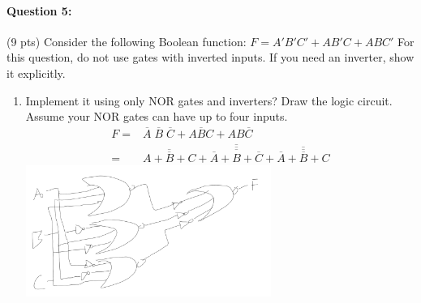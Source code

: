 \documentclass[12pt,letterpaper,titlepage]{report}
\begin{document}
\paragraph{Question 5: } (9 pts)  Consider the following Boolean function: $F = A′B′C′ + AB′C + ABC′$ For this question, do not use gates with inverted inputs. If you need an inverter, show it explicitly. 
\begin{enumerate}[label=\alph*)]
	\item Implement it using only NOR gates and inverters? Draw the logic circuit.  Assume your NOR gates can have up to four inputs.
	\begin{align*}
	F =& \overline{A}\;\overline{B}\;\overline{C} + A\overline{B}C + AB\overline{C}
	\\=& \overline{\overline{\overline{A+B+C}} + \overline{\overline{\overline{A}+B+\overline{C}}} + \overline{\overline{\overline{A}+\overline{B}+C}}}
	\end{align*}
	\includegraphics[width=8cm]{hw3p5a}


\end{enumerate}
\end{document}
